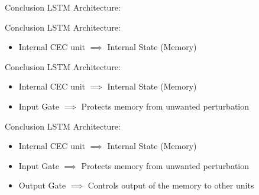 \documentclass[10pt, aspectratio=169]{beamer}
\begin{document}
\begin{frame}[t]{Conclusion}
LSTM Architecture:
\end{frame}


\begin{frame}[t]{Conclusion}
LSTM Architecture:
\begin{itemize}
    \item Internal CEC unit \begin{math}\implies \end{math} Internal State (Memory)
\end{itemize}
\end{frame}

\begin{frame}[t]{Conclusion}
LSTM Architecture:
\begin{itemize}
    \item Internal CEC unit \begin{math}\implies \end{math} Internal State (Memory)
    \item Input Gate \begin{math}\implies\end{math} Protects memory from unwanted perturbation
\end{itemize}
\end{frame}

\begin{frame}[t]{Conclusion}
LSTM Architecture:
\begin{itemize}
    \item Internal CEC unit \begin{math}\implies \end{math} Internal State (Memory)
    \item Input Gate \begin{math}\implies\end{math} Protects memory from unwanted perturbation
    \item Output Gate \begin{math}\implies\end{math} Controls output of the memory to other units
\end{itemize}
\end{frame}
\end{document}
